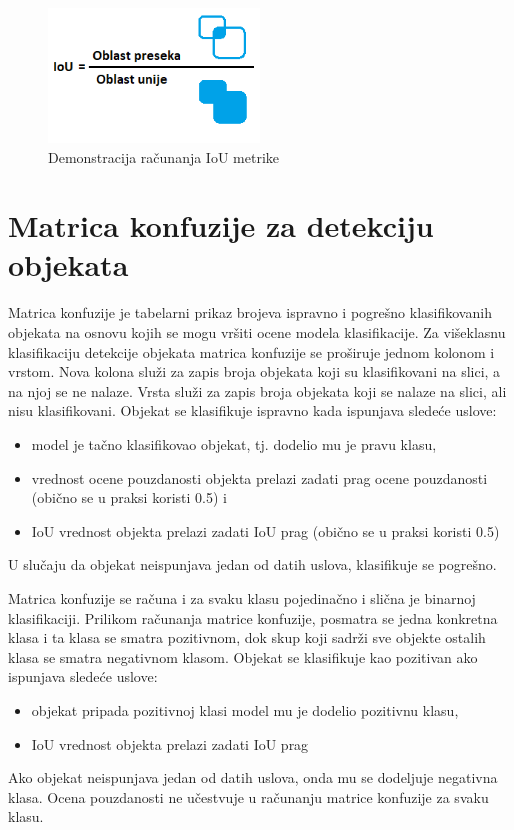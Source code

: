\documentclass[12pt,oneside]{memoir}
\begin{document}
\begin{figure}[!ht]
    \centering
    \includegraphics[width=0.5\textwidth]{matfmaster/glava3/iou_calc_cus.png}
    \caption{Demonstracija računanja IoU metrike}
    \label{fig:section3_iou_calc}
\end{figure}



\section{Matrica konfuzije za detekciju objekata}

Matrica konfuzije je tabelarni prikaz brojeva ispravno i pogrešno klasifikovanih objekata na osnovu kojih se mogu vršiti ocene modela klasifikacije. Za višeklasnu klasifikaciju detekcije objekata matrica konfuzije se proširuje jednom kolonom i vrstom. Nova kolona služi za zapis broja objekata koji su klasifikovani na slici, a na njoj se ne nalaze. Vrsta služi za zapis broja objekata koji se nalaze na slici, ali nisu klasifikovani.
Objekat se klasifikuje ispravno kada ispunjava sledeće uslove:
\begin{itemize}
    \item model je tačno klasifikovao objekat, tj. dodelio mu je pravu klasu,
    \item vrednost ocene pouzdanosti objekta prelazi zadati prag ocene pouzdanosti (obično se u praksi koristi 0.5) i 
    \item IoU vrednost objekta prelazi zadati IoU prag (obično se u praksi koristi 0.5)
\end{itemize}
U slučaju da objekat neispunjava jedan od datih uslova, klasifikuje se pogrešno. 

Matrica konfuzije se računa i za svaku klasu pojedinačno i slična je binarnoj klasifikaciji. Prilikom računanja matrice konfuzije, posmatra se jedna konkretna klasa i ta klasa se smatra pozitivnom, dok skup koji sadrži sve objekte ostalih klasa se smatra negativnom klasom.
Objekat se klasifikuje kao pozitivan ako ispunjava sledeće uslove:
\begin{itemize}
    \item objekat pripada pozitivnoj klasi model mu je dodelio pozitivnu klasu,
    \item IoU vrednost objekta prelazi zadati IoU prag
\end{itemize}
Ako objekat neispunjava jedan od datih uslova, onda mu se dodeljuje negativna klasa. Ocena pouzdanosti ne učestvuje u računanju matrice konfuzije za svaku klasu.
\end{document}
